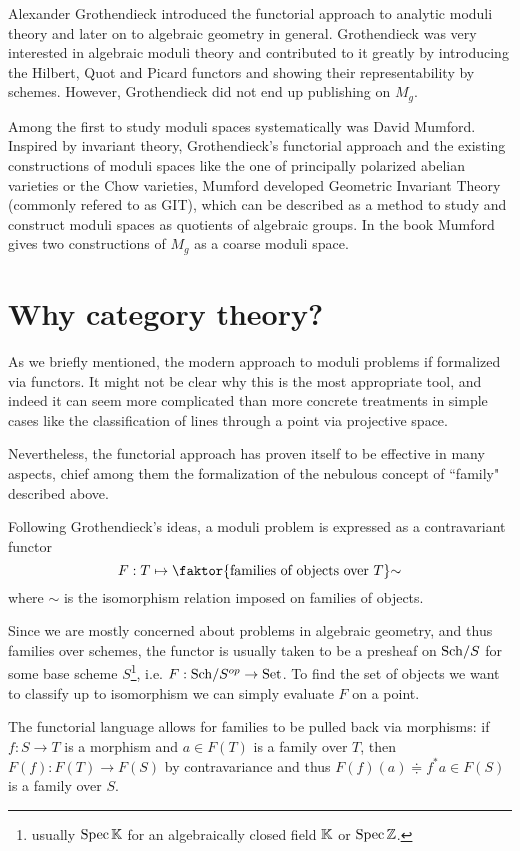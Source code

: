 Alexander Grothendieck introduced the functorial approach to analytic moduli theory and later on to algebraic geometry in general. Grothendieck was very interested in algebraic moduli theory and contributed to it greatly by introducing the Hilbert, Quot and Picard functors and showing their representability by schemes. However, Grothendieck did not end up publishing on $M_g$.\medskip

Among the first to study moduli spaces systematically was David Mumford. Inspired by invariant theory, Grothendieck's functorial approach and the existing constructions of moduli spaces like the one of principally polarized
abelian varieties or the Chow varieties, Mumford developed Geometric Invariant Theory (commonly refered to as GIT), which can be described as a method to study and construct moduli spaces as quotients of algebraic groups. In the book \cite{mumford1994geometric} Mumford gives two constructions of $M_g$ as a coarse moduli space.

\section*{Why category theory?}
As we briefly mentioned, the modern approach to moduli problems if formalized via functors. It might not be clear why this is the most appropriate tool, and indeed it can seem more complicated than more concrete treatments in simple cases like the classification of lines through a point via projective space.\medskip

Nevertheless, the functorial approach has proven itself to be effective in many aspects, chief among them the formalization of the nebulous concept of ``family" described above.\bigskip

Following Grothendieck's ideas, a moduli problem is expressed as a contravariant functor
\[F:T\mapsto \quot{\cpa{\text{families of objects over $T$}}}\sim\]
where $\sim$ is the isomorphism relation imposed on families of objects.

Since we are mostly concerned about problems in algebraic geometry, and thus families over schemes, the functor is usually taken to be a presheaf on ${\mathrm{Sch}}/{S}$ for some base scheme $S$\footnote{usually $\mathrm{Spec}\, \mathbb{K}$ for an algebraically closed field $\mathbb{K}$ or $\mathrm{Spec}\, \mathbb{Z}$.}, i.e. $F:{\mathrm{Sch}}/{S}^{op}\to\mathrm{Set}$.
To find the set of objects we want to classify up to isomorphism we can simply evaluate $F$ on a point.

The functorial language allows for families to be pulled back via morphisms: if $f:S\to T$ is a morphism and $a\in F(T)$ is a family over $T$, then $F(f):F(T)\to F(S)$ by contravariance and thus $F(f)(a)\doteqdot f^\ast a\in F(S)$ is a family over $S$.
\medskip

